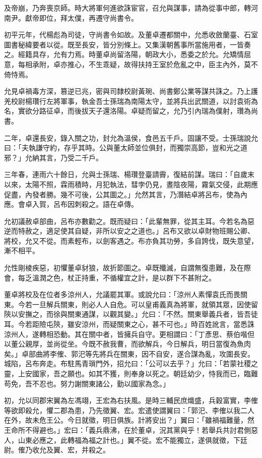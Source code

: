 \begin{pinyinscope}
及帝崩，乃奔喪京師。時大將軍何進欲誅宦官，召允與謀事，請為從事中郎，轉河南尹。獻帝即位，拜太僕，再遷守尚書令。

初平元年，代楊彪為司徒，守尚書令如故。及董卓遷都關中，允悉收斂蘭臺、石室圖書秘緯要者以從。既至長安，皆分別條上。又集漢朝舊事所當施用者，一皆奏之。經籍具存，允有力焉。時董卓尚留洛陽，朝政大小，悉委之於允。允矯情屈意，每相承附，卓亦推心，不生乖疑，故得扶持王室於危亂之中，臣主內外，莫不倚恃焉。

允見卓禍毒方深，篡逆已兆，密與司隸校尉黃琬、尚書鄭公業等謀共誅之。乃上護羌校尉楊瓚行左將軍事，執金吾士孫瑞為南陽太守，並將兵出武關道，以討袁術為名，實欲分路征卓，而後拔天子還洛陽。卓疑而留之，允乃引內瑞為僕射，瓚為尚書。

二年，卓還長安，錄入關之功，封允為溫侯，食邑五千戶。固讓不受。士孫瑞說允曰：「夫執謙守約，存乎其時。公與董太師並位俱封，而獨崇高節，豈和光之道邪？」允納其言，乃受二千戶。

三年春，連雨六十餘日，允與士孫瑞、楊瓚登臺請霽，復結前謀。瑞曰：「自歲末以來，太陽不照，霖雨積時，月犯執法，彗孛仍見，晝陰夜陽，霧氣交侵，此期應促盡，內發者勝。幾不可後，公其圖之。」允然其言，乃潛結卓將呂布，使為內應。會卓入賀，呂布因刺殺之。語在卓傳。

允初議赦卓部曲，呂布亦數勸之。既而疑曰：「此輩無罪，從其主耳。今若名為惡逆而特赦之，適足使其自疑，非所以安之之道也。」呂布又欲以卓財物班賜公卿、將校，允又不從。而素輕布，以劍客遇之。布亦負其功勞，多自誇伐，既失意望，漸不相平。

允性剛棱疾惡，初懼董卓豺狼，故折節圖之。卓既殲滅，自謂無復患難，及在際會，每乏溫潤之色，杖正持重，不循權宜之計，是以群下不甚附之。

董卓將校及在位者多涼州人，允議罷其軍。或說允曰：「涼州人素憚袁氏而畏關東。今若一旦解兵關東，則必人人自危。可以皇甫義真為將軍，就領其眾，因使留陝以安撫之，而徐與關東通謀，以觀其變。」允曰：「不然。關東舉義兵者，皆吾徒耳。今若距險屯陝，雖安涼州，而疑關東之心，甚不可也。」時百姓訛言，當悉誅涼州人，遂轉相恐動。其在關中者，皆擁兵自守。更相謂曰：「丁彥思、蔡伯喈但以董公親厚，並尚從坐。今既不赦我曹，而欲解兵，今日解兵，明日當復為魚肉矣。」卓部曲將李傕、郭汜等先將兵在關東，因不自安，遂合謀為亂，攻圍長安。城陷，呂布奔走。布駐馬青瑣門外，招允曰：「公可以去乎？」允曰：「若蒙社稷之靈，上安國家，吾之願也。如其不獲，則奉身以死之。朝廷幼少，恃我而已，臨難苟免，吾不忍也。努力謝關東諸公，勤以國家為念。」

初，允以同郡宋翼為左馮翊，王宏為右扶風。是時三輔民庶熾盛，兵穀富實，李傕等欲即殺允，懼二郡為患，乃先徵翼、宏。宏遣使謂翼曰：「郭汜、李傕以我二人在外，故未危王公。今日就徵，明日俱族。計將安出？」翼曰：「雖禍福難量，然王命所不得避也。」宏曰：「義兵鼎沸，在於董卓，況其黨與乎！若舉兵共討君側惡人，山東必應之，此轉福為福之計也。」翼不從。宏不能獨立，遂俱就徵，下廷尉。傕乃收允及翼、宏，并殺之。


\end{pinyinscope}
